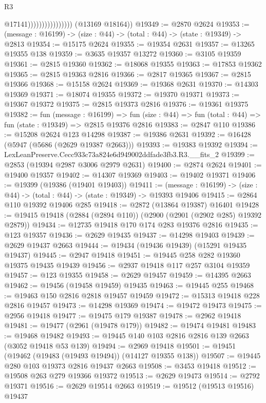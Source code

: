 \begin{lexlean}{R3}
\begin{coremodule}
                                      @17141))))))))))))))))
      (@13169 @18164))
@19349 := @2870 @2624
@19353 := (message : @16199) -> (size : @44) -> (total : @44) -> (state : @19349) -> @2813
@19354 := @15175 @2624
@19355 := @19354 @2631
@19357 := @13265 @19355 @138
@19359 := @3635 @19357 @13272
@19360 := @3105 @19359
@19361 := @2815 @19360
@19362 := @18068 @19355
@19363 := @17853 @19362
@19365 := @2815 @19363 @2816
@19366 := @2817 @19365
@19367 := @2815 @19366
@19368 := @15158 @2624
@19369 := @19368 @2631
@19370 := @14303 @19369
@19371 := @18074 @19355
@19372 := @19370 @19371
@19373 := @19367 @19372
@19375 := @2815 @19373 @2816
@19376 := @19361 @19375
@19382 := fun (message : @16199) =>
  fun (size : @44) => fun (total : @44) => fun (state : @19349) => @2815 @19376 @2816
@19383 := @2847 @110
@19386 := @15208 @2624 @123 @14298
@19387 := @19386 @2631
@19392 := @16428 (@5947 (@5686 (@2629 @19387 @2663)))
@19393 := @19383 @19392
@19394 := LexLeanPreserve.Cecc933c73a824e6d949002ddfade3fb3.R3.__fits_2
@19399 := @2853 (@19394 @2987 @3006 @2979 @2631)
@19400 := @2874 @2624
@19401 := @19400 @19357
@19402 := @14307 @19369
@19403 := @19402 @19371
@19406 := @19399 (@19386 (@19401 @19403))
@19411 := (message : @16199) -> (size : @44) -> (total : @44) -> (state : @19349) -> @19393 @19406
@19415 := @2864 @110 @19392 @19406 @285
@19418 := @2872 (@13864 @19387) @16401
@19428 := @19415 @19418 (@2884 (@2894 @110)) (@2900 (@2901 (@2902 @285) @19392 @2879))
@19434 := @12735 @19418 @170 @174 @283 @19376 @2816
@19435 := @123 @19357
@19436 := @2629 @19435
@19437 := @14298 @19403
@19439 := @2629 @19437 @2663
@19444 := @19434 (@19436 @19439) (@15291 @19435 @19437)
@19445 := @2947 @19418
@19451 := @19445 @258 @282 @19360 @19375 @19435 @19439
@19456 := @2937 @19418 @117 @257 @3104 @19359
@19457 := @123 @19355
@19458 := @2629 @19457
@19459 := @14395 @2663
@19462 := @19456 (@19458 @19459) @19435
@19463 := @19445 @255
@19468 := @19463 @150 @2816 @2818 @19457 @19459
@19472 := @15313 @19418 @228 @2816 @19457
@19473 := @14298 @19369
@19474 := @19472 @19473
@19475 := @2956 @19418
@19477 := @19475 @179 @19387
@19478 := @2962 @19418
@19481 := @19477 (@2961 (@19478 @179))
@19482 := @19474 @19481
@19483 := @19468 @19482
@19493 := @19445 @140 @103 @2816 @2816 @139 @2663 (@3052 @19418 @53 @139)
@19494 := @2969 @19418
@19501 := @19451 (@19462 (@19483 (@19493 @19494)) (@14127 @19355 @138))
@19507 := @19445 @280 @103 @19373 @2816 @19437 @2663
@19508 := @3453 @19418
@19512 := @19508 @263 @279 @19366 @19372
@19513 := @2629 @19473
@19514 := @2792 @19371
@19516 := @2629 @19514 @2663
@19519 := @19512 (@19513 @19516) @19437

\end{coremodule}
\end{lexlean}
